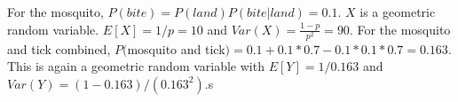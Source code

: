 \documentclass[../../probability-notes.tex]{subfile}
\begin{document}
        For the mosquito, $P(bite) =  P(land)P(bite|land) = 0.1$. $X$ is a geometric random variable. $E[X] = 1/p = 10$ and $Var(X) = \frac{1-p}{p^{2}} = 90$.\newline
        For the mosquito and tick combined, $P($mosquito and tick$) = 0.1 + 0.1*0.7 - 0.1*0.1*0.7 = 0.163$. This is again a geometric random variable with $E[Y] = 1/0.163$ and $Var(Y) = (1-0.163)/(0.163^{2})$.s
\end{document}
